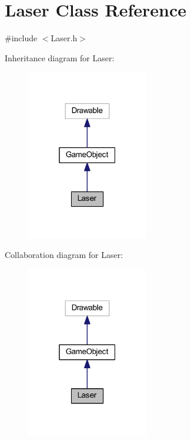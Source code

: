\hypertarget{class_laser}{}\section{Laser Class Reference}
\label{class_laser}


{\ttfamily \#include $<$Laser.\+h$>$}



Inheritance diagram for Laser\+:\nopagebreak
\begin{figure}[H]
\begin{center}
\leavevmode
\includegraphics[width=151pt]{class_laser__inherit__graph}
\end{center}
\end{figure}


Collaboration diagram for Laser\+:\nopagebreak
\begin{figure}[H]
\begin{center}
\leavevmode
\includegraphics[width=151pt]{class_laser__coll__graph}
\end{center}
\end{figure}
